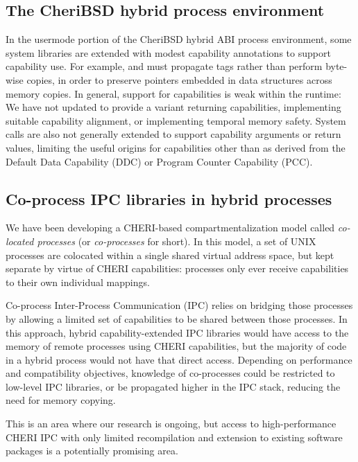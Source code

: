 \documentclass[12pt,twoside,openright,a4paper]{article}
\newcommand{\ccode}[1]{{\small\ttfamily{#1}}}
\begin{document}
\subsection{The CheriBSD hybrid process environment}

In the usermode portion of the CheriBSD hybrid ABI process environment, some
system libraries are extended with modest capability annotations to support
capability use.
For example, \ccode{memcpy()} and \ccode{sort()} must propagate tags rather
than perform byte-wise copies, in order to preserve pointers embedded in data
structures across memory copies.
In general, support for capabilities is weak within the runtime: We have not
updated \ccode{malloc()} to provide a \ccode{malloc\_c()} variant returning
capabilities, implementing suitable capability alignment, or implementing
temporal memory safety.
System calls are also not generally extended to support capability arguments
or return values, limiting the useful origins for capabilities other than as
derived from the Default Data Capability (DDC) or Program Counter Capability
(PCC).

\subsection{Co-process IPC libraries in hybrid processes}

We have been developing a CHERI-based compartmentalization model called
\textit{co-located processes} (or \textit{co-processes} for short).
In this model, a set of UNIX processes are colocated within a single shared
virtual address space, but kept separate by virtue of CHERI capabilities:
processes only ever receive capabilities to their own individual mappings.

Co-process Inter-Process Communication (IPC) relies on bridging those
processes by allowing a limited set of capabilities to be shared between those
processes.
In this approach, hybrid capability-extended IPC libraries would have access
to the memory of remote processes using CHERI capabilities, but the majority
of code in a hybrid process would not have that direct access.
Depending on performance and compatibility objectives, knowledge of
co-processes could be restricted to low-level IPC libraries, or be propagated
higher in the IPC stack, reducing the need for memory copying.

This is an area where our research is ongoing, but access to high-performance
CHERI IPC with only limited recompilation and extension to existing software
packages is a potentially promising area.
\end{document}
